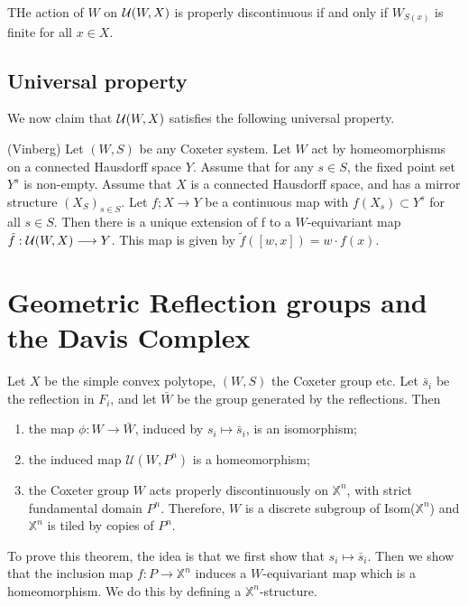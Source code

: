 \documentclass[12pt]{article}
\begin{document}
\begin{lemma}
    THe action of $W$ on $\mathcal{U}(W,X)$ is properly discontinuous if and only if $W_{S(x)}$ is finite for all $x\in X$. 
\end{lemma}

\subsection{Universal property}

We now claim that $\mathcal{U}(W,X)$ satisfies the following universal property.

\begin{theorem}
    (Vinberg) Let $(W,S)$ be any Coxeter system. Let $W$ act by homeomorphisms on a connected Hausdorff space $Y$. Assume that for any $s\in S$, the fixed point set $Y^s$ is non-empty. Assume that $X$ is a connected Hausdorff space, and has a mirror structure $(X_S)_{s\in S}$. Let $f;X\longrightarrow Y$ be a continuous map with $f(X_s)\subset Y^s$ for all $s\in S$. Then there is a unique extension of f to a $W$-equivariant map $\tilde{f}:\mathcal{U}(W,X) \longrightarrow Y$. This map is given by $\tilde{f}([w,x])=w\cdot f(x)$. 
\end{theorem}

\section{Geometric Reflection groups and the Davis Complex}
\begin{theorem}
    Let $X$ be the simple convex polytope, $(W,S)$ the Coxeter group etc. Let $\bar{s}_i$ be the reflection in $F_i$, and let $\bar{W}$ be the group generated by the reflections. Then 
    \begin{enumerate}
        \item the map $\phi: W\longrightarrow\bar{W}$, induced by $s_i\mapsto \bar{s}_i$, is an isomorphism;
        \item the induced map $\mathcal{U}(W,P^n)$ is a homeomorphism;
        \item the Coxeter group $W$ acts properly discontinuously on $\mathbb{X}^n$, with strict fundamental domain $P^n$. Therefore, $W$ is a discrete subgroup of Isom($\mathbb{X}^n$) and $\mathbb{X}^n$ is tiled by copies of $P^n$. 
    \end{enumerate}

\end{theorem}

To prove this theorem, the idea is that we first show that $s_i\mapsto \bar{s}_i$. Then we show that the inclusion map $f: P\longrightarrow \mathbb{X}^n$ induces a $W$-equivariant map which is a homeomorphism. We do this by defining a $\mathbb{X}^n$-structure.
\end{document}
